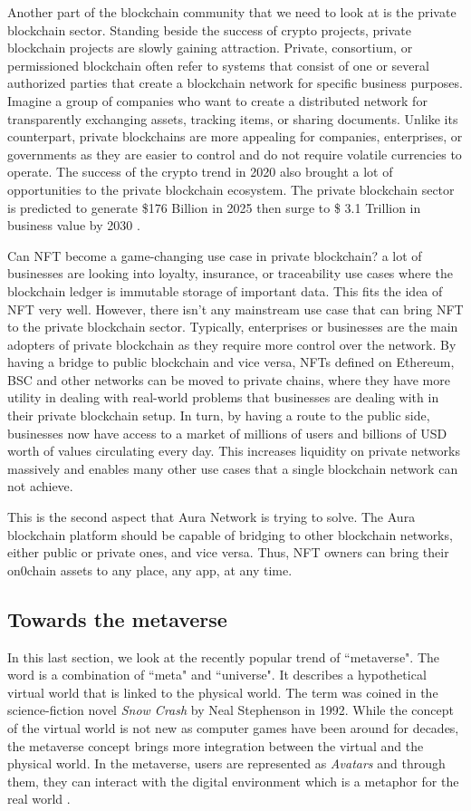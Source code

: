 \documentclass[12pt, titlepage]{article}
\begin{document}
Another part of the blockchain community that we need to look at is the private blockchain sector. Standing beside the success of crypto projects, private blockchain projects are slowly gaining attraction. Private, consortium, or permissioned blockchain often refer to systems that consist of one or several authorized parties that create a blockchain network for specific business purposes. Imagine a group of companies who want to create a distributed network for transparently exchanging assets, tracking items, or sharing documents. Unlike its counterpart, private blockchains are more appealing for companies, enterprises, or governments as they are easier to control and do not require volatile currencies to operate. The success of the crypto trend in 2020 also brought a lot of opportunities to the private blockchain ecosystem. The private blockchain sector is predicted to generate \$176 Billion in 2025 then surge to  \$ 3.1 Trillion in business value by 2030 \cite{privatebc}. 

Can NFT become a game-changing use case in private blockchain? a lot of businesses are looking into loyalty, insurance, or traceability use cases where the blockchain ledger is immutable storage of important data. This fits the idea of NFT very well. However, there isn't any mainstream use case that can bring NFT to the private blockchain sector. Typically, enterprises or businesses are the main adopters of private blockchain as they  require more control over the network. By having a bridge to public blockchain and vice versa, NFTs defined on Ethereum, BSC and other networks can be moved to private chains, where they have more utility in dealing with real-world problems that businesses are dealing with in their private blockchain setup. In turn, by having a route to the public side, businesses now have access to a market of millions of users and billions of USD worth of values circulating every day. This increases liquidity on private networks massively and enables many other use cases that a single blockchain network can not achieve.

This is the second aspect that Aura Network is trying to solve. The Aura blockchain platform should be capable of bridging to other blockchain networks, either public or private ones, and vice versa. Thus, NFT owners can bring their on0chain assets to any place, any app, at any time. 

\subsection{Towards the metaverse}
In this last section, we look at the recently popular trend of ``metaverse". The word is a combination of ``meta" and ``universe". It describes a hypothetical virtual world that is linked to the physical world. The term was coined in the science-fiction novel \emph{Snow Crash} by Neal Stephenson in 1992. While the concept of the virtual world is not new as computer games have been around for decades, the metaverse concept brings more integration between the virtual and the physical world. In the metaverse, users are represented as \emph{Avatars} and through them, they can interact with the digital environment which is a metaphor for the real world \cite{lee2021all}.
\end{document}
